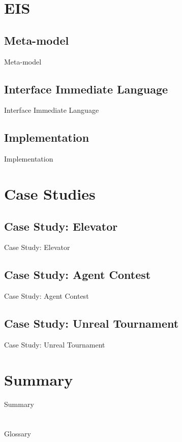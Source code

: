 \documentclass{beamer}
\begin{document}
\section{EIS}
\subsection{Meta-model}
\begin{frame}{Meta-model}
\end{frame}
\subsection{Interface Immediate Language}
\begin{frame}{Interface Immediate Language}
\end{frame}
\subsection{Implementation}
\begin{frame}{Implementation}
\end{frame}
\section{Case Studies}
\subsection{Case Study: Elevator}
\begin{frame}{Case Study: Elevator}
\end{frame}
\subsection{Case Study: Agent Contest}
\begin{frame}{Case Study: Agent Contest}
\end{frame}
\subsection{Case Study: Unreal Tournament}
\begin{frame}{Case Study: Unreal Tournament}
\end{frame}
\section{Summary}
\begin{frame}{Summary}
\end{frame}
\section{}
\begin{frame}{Glossary}
\end{frame}
\end{document}
